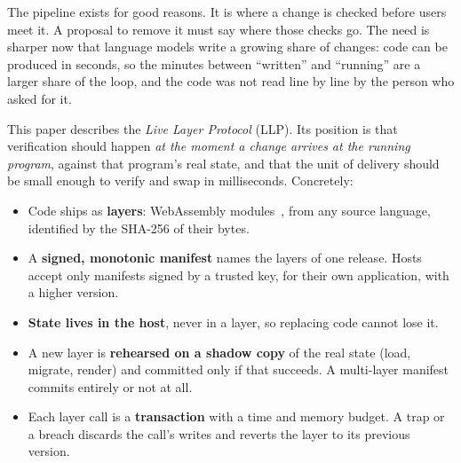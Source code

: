\documentclass[10pt,twocolumn]{article}
\begin{document}
The pipeline exists for good reasons. It is where a change is checked before users meet it. A
proposal to remove it must say where those checks go. The need is sharper now that language
models write a growing share of changes: code can be produced in seconds, so the minutes between
``written'' and ``running'' are a larger share of the loop, and the code was not read line by line by
the person who asked for it.

This paper describes the \emph{Live Layer Protocol} (LLP). Its position is that verification
should happen \emph{at the moment a change arrives at the running program}, against that
program's real state, and that the unit of delivery should be small enough to verify and swap in
milliseconds. Concretely:

\begin{itemize}
\item Code ships as \textbf{layers}: WebAssembly modules~\cite{haas2017wasm}, from any source
language, identified by the SHA-256 of their bytes.
\item A \textbf{signed, monotonic manifest} names the layers of one release. Hosts accept only
manifests signed by a trusted key, for their own application, with a higher version.
\item \textbf{State lives in the host}, never in a layer, so replacing code cannot lose it.
\item A new layer is \textbf{rehearsed on a shadow copy} of the real state (load, migrate, render)
and committed only if that succeeds. A multi-layer manifest commits entirely or not at all.
\item Each layer call is a \textbf{transaction} with a time and memory budget. A trap or a
breach discards the call's writes and reverts the layer to its previous version.
\end{itemize}
\end{document}
